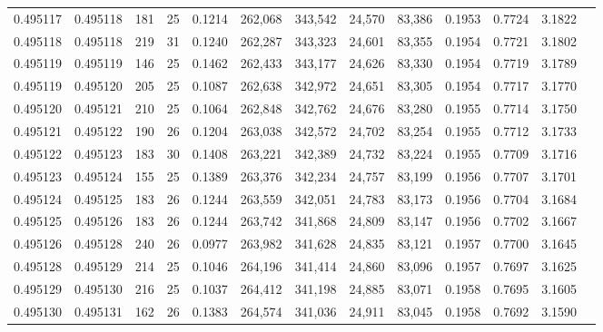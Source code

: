 \begin{tabular}{rrrrrrrrrrrrr}
0.495117 & 0.495118 & 181 &  25 &                                     0.1214 & 262,068 & 343,542 &  24,570 &  83,386 & 0.1953 & 0.7724 & 3.1822 \\
0.495118 & 0.495118 & 219 &  31 &                                     0.1240 & 262,287 & 343,323 &  24,601 &  83,355 & 0.1954 & 0.7721 & 3.1802 \\
0.495119 & 0.495119 & 146 &  25 &                                     0.1462 & 262,433 & 343,177 &  24,626 &  83,330 & 0.1954 & 0.7719 & 3.1789 \\
0.495119 & 0.495120 & 205 &  25 &                                     0.1087 & 262,638 & 342,972 &  24,651 &  83,305 & 0.1954 & 0.7717 & 3.1770 \\
0.495120 & 0.495121 & 210 &  25 &                                     0.1064 & 262,848 & 342,762 &  24,676 &  83,280 & 0.1955 & 0.7714 & 3.1750 \\
0.495121 & 0.495122 & 190 &  26 &                                     0.1204 & 263,038 & 342,572 &  24,702 &  83,254 & 0.1955 & 0.7712 & 3.1733 \\
0.495122 & 0.495123 & 183 &  30 &                                     0.1408 & 263,221 & 342,389 &  24,732 &  83,224 & 0.1955 & 0.7709 & 3.1716 \\
0.495123 & 0.495124 & 155 &  25 &                                     0.1389 & 263,376 & 342,234 &  24,757 &  83,199 & 0.1956 & 0.7707 & 3.1701 \\
0.495124 & 0.495125 & 183 &  26 &                                     0.1244 & 263,559 & 342,051 &  24,783 &  83,173 & 0.1956 & 0.7704 & 3.1684 \\
0.495125 & 0.495126 & 183 &  26 &                                     0.1244 & 263,742 & 341,868 &  24,809 &  83,147 & 0.1956 & 0.7702 & 3.1667 \\
0.495126 & 0.495128 & 240 &  26 &                                     0.0977 & 263,982 & 341,628 &  24,835 &  83,121 & 0.1957 & 0.7700 & 3.1645 \\
0.495128 & 0.495129 & 214 &  25 &                                     0.1046 & 264,196 & 341,414 &  24,860 &  83,096 & 0.1957 & 0.7697 & 3.1625 \\
0.495129 & 0.495130 & 216 &  25 &                                     0.1037 & 264,412 & 341,198 &  24,885 &  83,071 & 0.1958 & 0.7695 & 3.1605 \\
0.495130 & 0.495131 & 162 &  26 &                                     0.1383 & 264,574 & 341,036 &  24,911 &  83,045 & 0.1958 & 0.7692 & 3.1590 \\

\end{tabular}
